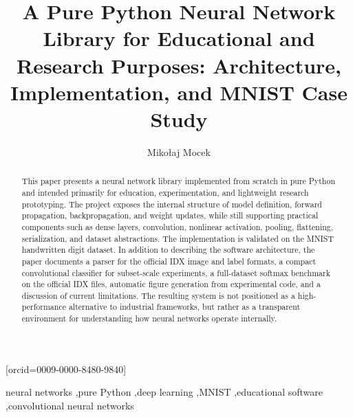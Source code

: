 \documentclass[]{ceurart}
\begin{document}



\title{A Pure Python Neural Network Library for Educational and Research Purposes: Architecture, Implementation, and MNIST Case Study}

\author[1]{Miko{\l}aj Mocek}[orcid=0009-0000-8480-9840]

\address[1]{Politechnika {\'S}l{\k a}ska, Gliwice, Poland}

\begin{abstract}
This paper presents a neural network library implemented from scratch in pure Python and intended primarily for education, experimentation, and lightweight research prototyping. The project exposes the internal structure of model definition, forward propagation, backpropagation, and weight updates, while still supporting practical components such as dense layers, convolution, nonlinear activation, pooling, flattening, serialization, and dataset abstractions. The implementation is validated on the MNIST handwritten digit dataset. In addition to describing the software architecture, the paper documents a parser for the official IDX image and label formats, a compact convolutional classifier for subset-scale experiments, a full-dataset softmax benchmark on the official IDX files, automatic figure generation from experimental code, and a discussion of current limitations. The resulting system is not positioned as a high-performance alternative to industrial frameworks, but rather as a transparent environment for understanding how neural networks operate internally.
\end{abstract}

\begin{keywords}
neural networks \sep pure Python \sep deep learning \sep MNIST \sep educational software \sep convolutional neural networks
\end{keywords}

\maketitle
\end{document}
